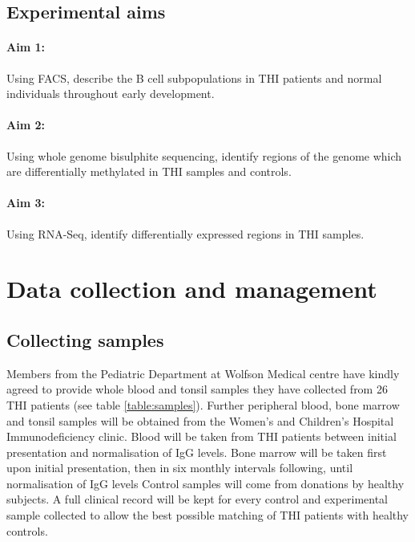 \documentclass[12pt]{article}
\begin{document}
			
		\subsection{Experimental aims}
		
			\paragraph{Aim 1:} Using FACS, describe the B cell subpopulations in THI patients and normal individuals throughout early development.
			
			\paragraph{Aim 2:} Using whole genome bisulphite sequencing, identify regions of the genome which are differentially methylated in THI samples and controls.
			
			\paragraph{Aim 3:} Using RNA-Seq, identify differentially expressed regions in THI samples.

	\section{Data collection and management}
	
		\subsection{Collecting samples}
			
			Members from the Pediatric Department at Wolfson Medical centre have kindly agreed to provide whole blood and tonsil samples they have collected from 26 THI patients (see table \ref{table:samples}).
			Further peripheral blood, bone marrow and tonsil samples will be obtained from the Women's and Children's Hospital Immunodeficiency clinic. 
			Blood will be taken from THI patients between initial presentation and normalisation of IgG levels.
			Bone marrow will be taken first upon initial presentation, then in six monthly intervals following, until normalisation of IgG levels
			Control samples will come from donations by healthy subjects. 
			A full clinical record will be kept for every control and experimental sample collected to allow the best possible matching of THI patients with healthy controls. 
		
\end{document}

